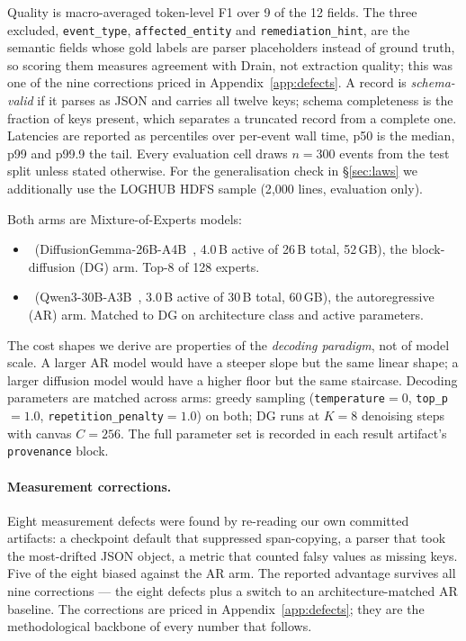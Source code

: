 Quality is macro-averaged token-level F1 over 9 of the 12 fields. The
three excluded, \texttt{event\_type}, \texttt{affected\_entity} and
\texttt{remediation\_hint}, are the semantic fields whose gold
labels are parser placeholders instead of ground truth, so scoring
them measures agreement with Drain, not extraction quality; this was
one of the nine corrections priced in Appendix~\ref{app:defects}.
A record is \emph{schema-valid} if it parses as JSON and carries all
twelve keys; schema completeness is the fraction of keys present, which
separates a truncated record from a complete one. Latencies are
reported as percentiles over per-event wall time, p50 is the median,
p99 and p99.9 the tail. Every evaluation cell draws $n = 300$ events
from the test split unless stated otherwise. For the generalisation check in \S\ref{sec:laws} we
additionally use the LOGHUB HDFS sample (2{,}000 lines, evaluation
only).

Both arms are Mixture-of-Experts models:
\begin{itemize}[nosep]
\item \DG\ (DiffusionGemma-26B-A4B~\cite{diffusiongemma}, 4.0\,B active
  of 26\,B total, 52\,GB), the block-diffusion (DG) arm. Top-8 of 128
  experts.
\item \ARthree\ (Qwen3-30B-A3B~\cite{qwen25}, 3.0\,B active of 30\,B
  total, 60\,GB), the autoregressive (AR) arm. Matched to DG on
  architecture class and active parameters.
\end{itemize}
The cost shapes we derive are properties of the \emph{decoding
paradigm}, not of model scale. A larger AR model would have a steeper
slope but the same linear shape; a larger diffusion model would have a
higher floor but the same staircase. Decoding parameters are matched
across arms: greedy sampling (\texttt{temperature}${=}0$,
\texttt{top\_p}${=}1.0$, \texttt{repetition\_penalty}${=}1.0$) on
both; DG runs at $K{=}8$ denoising steps with canvas $C{=}256$. The
full parameter set is recorded in each result artifact's
\texttt{provenance} block.

\paragraph{Measurement corrections.}

Eight measurement defects were found by re-reading our own committed
artifacts: a checkpoint default that suppressed span-copying, a parser
that took the most-drifted JSON object, a metric that counted falsy
values as missing keys. Five of the eight biased against the AR arm.
The reported advantage survives all nine corrections --- the eight
defects plus a switch to an architecture-matched AR baseline. The
corrections are priced in Appendix~\ref{app:defects}; they are the
methodological backbone of every number that follows.

